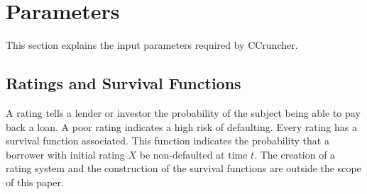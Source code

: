 \documentclass[a4paper,12pt,final]{article}
\begin{document}

\section{Parameters}

This section explains the input parameters required by CCruncher.

\subsection{Ratings and Survival Functions}
A rating tells a lender or investor the probability of the subject being 
able to pay back a loan. A poor rating indicates a high risk of defaulting.
Every rating has a survival function associated. This function indicates 
the probability that a borrower with initial rating $X$ be non-defaulted at 
time $t$. The creation of a rating system and the construction of the 
survival functions are outside the scope of this paper.
\end{document}
